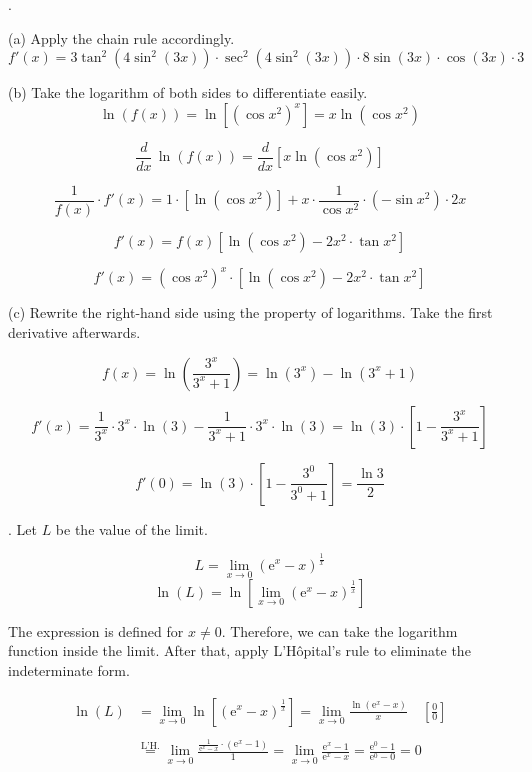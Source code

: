 \documentclass{article}
\begin{document}
\newpage

.

\hfill

\noindent (a) Apply the chain rule accordingly.
\[\boxed{f'(x) = 3\tan^2\left(4\sin^2(3x)\right)\cdot \sec^2\left(4\sin^2(3x)\right)\cdot8\sin(3x)\cdot \cos(3x)\cdot 3}\]

\hfill

\noindent (b) Take the logarithm of both sides to differentiate easily.
\[\ln\left(f(x)\right)=\ln\left[\left(\cos x^2\right)^x\right]=x\ln\left(\cos x^2\right)\]

\[\frac{d}{dx}\,\ln\left(f(x)\right)=\frac{d}{dx}\left[x\ln\left(\cos x^2\right)\right]\]

\[\frac1{f(x)}\cdot f'(x)=1\cdot\left[\ln\left(\cos x^2\right)\right]+x\cdot\frac1{\cos x^2}\cdot\left(-\sin x^2\right)\cdot2x\]

\[f'(x)=f(x)\left[\ln\left(\cos x^2\right)-2x^2\cdot\tan x^2\right]\]

\[\boxed{f'(x)=\left(\cos x^2\right)^x\cdot\left[\ln\left(\cos x^2\right)-2x^2\cdot\tan x^2\right]}\]

\hfill

\noindent (c) Rewrite the right-hand side using the property of logarithms. Take the first derivative afterwards.

\[f(x)=\ln\left(\frac{3^x}{3^x+1}\right)=\ln\left(3^x\right)-\ln\left(3^x+1\right)\]

\[f'(x)=\frac1{3^x}\cdot 3^x\cdot\ln(3)-\frac1{3^x+1}\cdot3^x\cdot\ln(3)=\ln(3)\cdot\left[1-\frac{3^x}{3^x+1}\right]\]

\[f'(0)=\ln(3)\cdot\left[1-\frac{3^0}{3^0+1}\right]=\boxed{\frac{\ln3}2}\]

\hfill

. Let $L$ be the value of the limit.

\[L = \lim_{x\to0}\left(\mathrm{e}^x-x\right)^{\frac1x}\]
\[\ln(L) = \ln\left[\lim_{x\to0}\left(\mathrm{e}^x-x\right)^{\frac1x}\right]\]

\hfill

\noindent The expression is defined for $x\neq0$. Therefore, we can take the logarithm function inside the limit. After that, apply L'Hôpital's rule to eliminate the indeterminate form.

\begin{align*}\ln(L)&=\lim_{x\to0}\ln\left[\left(\mathrm{e}^x-x\right)^{\frac1x}\right]=\lim_{x\to0}\frac{\ln\left(\mathrm{e}^x-x\right)}x\quad\left[\frac00\right]\\\\&\overset{\text{L'H.}}{=}\lim_{x\to0}\frac{\displaystyle\frac{1}{\mathrm{e}^x-x}\cdot\left(\mathrm{e}^x-1\right)}{1}=\lim_{x\to0}\frac{\mathrm{e}^x-1}{\mathrm{e}^x-x}=\frac{\mathrm{e}^0-1}{\mathrm{e}^0-0}=0\end{align*}
\end{document}
